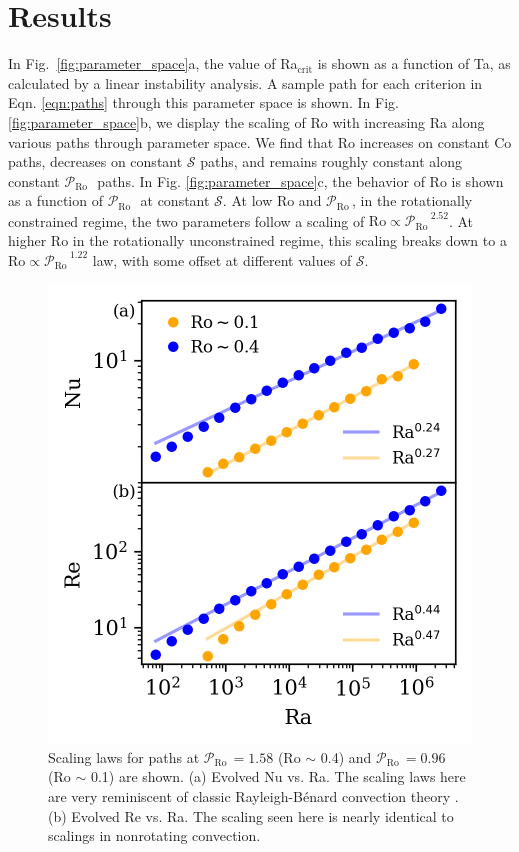 \documentclass[twocolumn, amsmath, amsfonts, amssymb]{aastex62}
\newcommand{\RB}{Rayleigh-B\'{e}nard }
\newcommand{\pro}{\ensuremath{\mathcal{P}_{\text{Ro}}\,}}
\begin{document}
\section{Results}
\label{sec:results}
In Fig.~\ref{fig:parameter_space}a, the value of Ra$_{\text{crit}}$
is shown as a function of Ta, as
calculated by a linear instability analysis. A sample path for
each criterion in Eqn. \ref{eqn:paths} through
this parameter space is shown.
In Fig. \ref{fig:parameter_space}b, we display the scaling of Ro
with increasing Ra along various paths through parameter space.
We find that Ro increases on constant Co paths, decreases on constant $\mathcal{S}$
paths, and remains roughly constant along constant \pro$\,$ paths.
In Fig. \ref{fig:parameter_space}c, the behavior of Ro is shown as
a function of \pro$\,$ at constant $\mathcal{S}$.
At low Ro and \pro, in the rotationally constrained regime, the two parameters
follow a scaling of $\text{Ro}\propto\pro^{2.52}$.
At higher Ro in the rotationally unconstrained regime, this scaling breaks down
to a $\text{Ro}\propto\pro^{1.22}$ law, with some offset at different values of $\mathcal{S}$.

\begin{figure}[t!]
    \includegraphics{./figs/nu_and_re.png}
    \caption{Scaling laws for paths at $\pro = 1.58$ (Ro $\sim$ 0.4) and
    $\pro = 0.96$ (Ro $\sim$ 0.1) are shown. 
    (a) Evolved Nu vs. Ra. The scaling laws here are very reminiscent of classic \RB convection
    theory \citep{ahlers&all2009}.
    (b) Evolved Re vs. Ra.
    The scaling seen here is nearly identical to scalings in nonrotating convection.
    \label{fig:nu_and_re} }
\end{figure}
\end{document}
